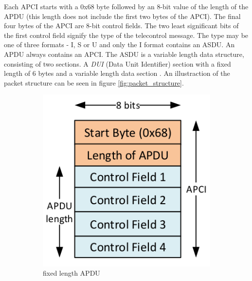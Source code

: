 Each APCI starts with a 0x68 byte followed by an 8-bit value of the length of the APDU (this length does not include the first two bytes of the APCI).
The final four bytes of the APCI are 8-bit control fields. The two least significant bits of the first control field signify the type of the telecontrol message.
The type may be one of three formats - I, S or U and only the I format contains an ASDU. An APDU always contains an APCI.
The ASDU is a variable length data structure, consisting of two sections. A \emph{DUI} (Data Unit Identifier) section with a fixed length of 6 bytes and
a variable length data section \cite{mai2019iec}\cite{IEC104}. An illustraction of the packet structure can be seen in figure \ref{fig:packet_structure}.

\begin{figure}
  \centering
  \begin{subfigure}[b]{0.3\textwidth}
    \centering
    \includegraphics[width=\textwidth]{obrazky-figures/apdu_fixed_length.png}
    \caption{fixed length APDU}
    \label{fig:fixed_length_APDU}
  \end{subfigure}
  \hfill
  \begin{subfigure}[b]{0.3\textwidth}
    \centering

\end{subfigure}
\end{figure}
